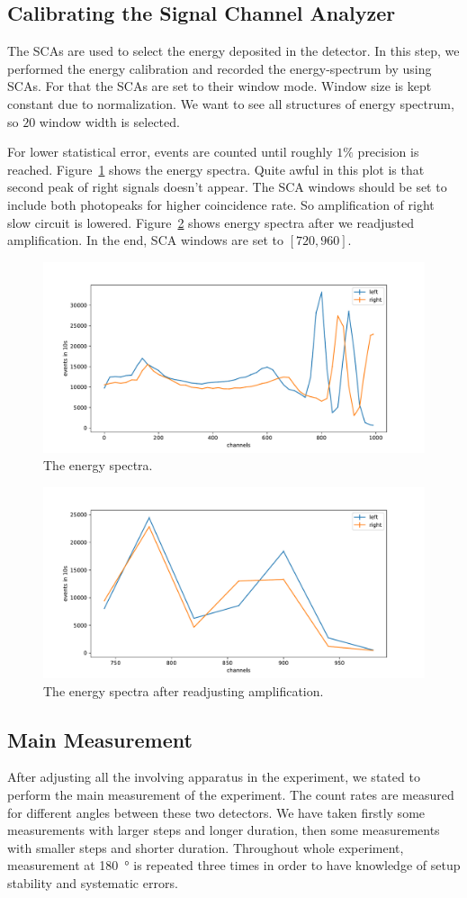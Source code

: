 \subsection{Calibrating the Signal Channel Analyzer}
The SCAs are used to select the energy deposited in the detector. In this step, we performed the energy calibration and recorded the energy-spectrum by using SCAs. For that the SCAs are set to their window mode. Window size is kept constant due to normalization. We want to see all structures of energy spectrum, so $20$ window width is selected. 

For lower statistical error, events are counted until roughly $1\%$ precision is reached. Figure~\ref{fig:sca1} shows the energy spectra. Quite awful in this plot is that second peak of right signals doesn't appear. The SCA windows should be set to include both photopeaks for higher coincidence rate. So amplification of right slow circuit is lowered. Figure~\ref{fig:sca2} shows energy spectra after we readjusted amplification. In the end, SCA windows are set to $[720, 960]$.
\begin{figure}[ht]
	\centering
	\includegraphics[width=0.7\linewidth]{./figs/sca.pdf}
	\caption{The energy spectra.}%
	\label{fig:sca1}
\end{figure}
\begin{figure}[ht]
	\centering
	\includegraphics[width=0.7\linewidth]{./figs/sca2.pdf}
	\caption{The energy spectra after readjusting amplification. }%
	\label{fig:sca2}
\end{figure}

\subsection{Main Measurement}
After adjusting all the involving apparatus in the experiment, we stated to perform the main measurement of the experiment. The count rates are measured for different angles between these two detectors. We have taken firstly some measurements with larger steps and longer duration, then some measurements with smaller steps and shorter duration.  Throughout whole experiment, measurement at \SI{180}{\degree} is repeated three times in order to have knowledge of setup stability and systematic errors.


